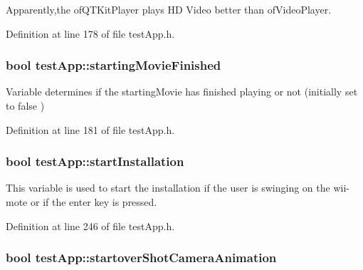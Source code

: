 Apparently,the of\-Q\-T\-Kit\-Player plays H\-D Video better than of\-Video\-Player. 



Definition at line 178 of file test\-App.\-h.

\hypertarget{classtest_app_aea3cb9f5f0061a42a4953d6b6c949036}{
\subsubsection[{starting\-Movie\-Finished}]{\setlength{\rightskip}{0pt plus 5cm}bool test\-App\-::starting\-Movie\-Finished}}\label{classtest_app_aea3cb9f5f0061a42a4953d6b6c949036}


Variable determines if the starting\-Movie has finished playing or not (initially set to false ) 



Definition at line 181 of file test\-App.\-h.

\hypertarget{classtest_app_a8a65a6d1a473417cec1c2ac2e6116aae}{
\subsubsection[{start\-Installation}]{\setlength{\rightskip}{0pt plus 5cm}bool test\-App\-::start\-Installation}}\label{classtest_app_a8a65a6d1a473417cec1c2ac2e6116aae}


This variable is used to start the installation if the user is swinging on the wii-\/mote or if the enter key is pressed. 



Definition at line 246 of file test\-App.\-h.

\hypertarget{classtest_app_ad2fca6ce5e37462cd820afc48633324d}{
\subsubsection[{startover\-Shot\-Camera\-Animation}]{\setlength{\rightskip}{0pt plus 5cm}bool test\-App\-::startover\-Shot\-Camera\-Animation}}\label{classtest_app_ad2fca6ce5e37462cd820afc48633324d}


